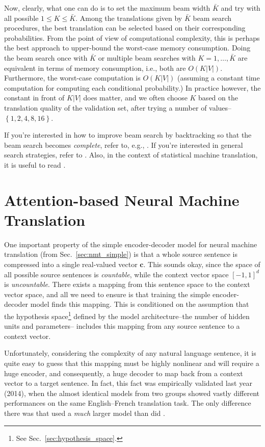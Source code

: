 \documentclass{report}
\newcommand{\vect}[1]{\mathbf{#1}}
\newcommand{\vc}[0]{\vect{c}}
\begin{document}
Now, clearly, what one can do is to set the maximum beam width $\bar{K}$ and try
with all possible $1 \leq K \leq \bar{K}$. Among the translations given by
$\bar{K}$ beam search procedures, the best translation can be selected based on
their corresponding probabilities. From the point of view of computational
complexity, this is perhaps the best approach to upper-bound the worst-case
memory consumption. Doing the beam search once with $\bar{K}$ or multiple beam
searches with $K=1,\ldots,\bar{K}$ are equivalent in terms of memory
consumption, i.e., both are $O(K|V|)$. Furthermore, the worst-case computation
is $O(K|V|)$ (assuming a constant time computation for computing each
conditional probability.) In practice however, the constant in front of $K|V|$
does matter, and we often choose $K$ based on the translation quality of the
validation set, after trying a number of values--$\left\{ 1, 2, 4, 8, 16
\right\}$.

If you're interested in how to improve beam search by backtracking so that the
beam search becomes {\em complete}, refer to, e.g.,
\citet{furcy2005limited,zhou2005beam}. If you're interested in general search
strategies, refer to \citet{russell1995artificial}.  Also, in the context of
statistical machine translation, it is useful to read \citet{koehn2004pharaoh}.


\section{Attention-based Neural Machine Translation}
\label{sec:att_mt}

One important property of the simple encoder-decoder model for neural machine
translation (from Sec.~\ref{sec:nmt_simple}) is that a whole source sentence is
compressed into a single real-valued vector $\vc$. This sounds okay, since the
space of all possible source sentences is {\em countable}, while the context
vector space $\left[ -1, 1 \right]^d$ is {\em uncountable}. There exists a
mapping from this sentence space to the context vector space, and all we need to
ensure is that training the simple encoder-decoder model finds this mapping.
This is conditioned on the assumption that the hypothesis space\footnote{
    See Sec.~\ref{sec:hypothesis_space}.
}
defined by the
model architecture--the number of hidden units and parameters-- includes this
mapping from any source sentence to a context vector.

Unfortunately, considering the complexity of any natural language sentence, it
is quite easy to guess that this mapping must be highly nonlinear and will require
a huge encoder, and consequently, a huge decoder to map back from a context
vector to a target sentence. In fact, this fact was empirically validated last
year (2014), when the almost identical models from two groups
\citep{sutskever2014sequence,cho2014properties} showed vastly different
performances on the same English--French translation task. The only difference
there was that \citet{sutskever2014sequence} used a {\em much}
larger model than did \citet{cho2014properties}.
\end{document}
